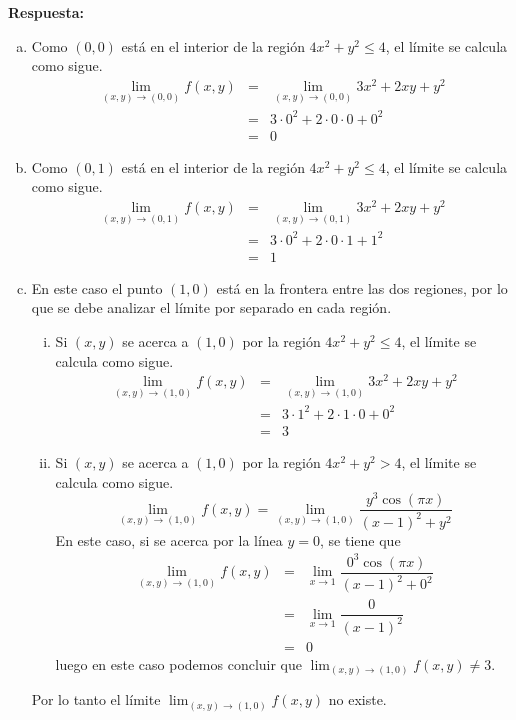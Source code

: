 \documentclass{article}
\begin{document}
\vspace{5mm}
\noindent\textbf{Respuesta:}
\begin{enumerate}[a)]
  \item Como $(0,0)$ está en el interior de la región $4x^2+y^2 \leq 4$, el límite se calcula como sigue.
    \begin{eqnarray*}
      \lim_{(x,y)\to(0,0)}f(x,y)  
        &=& \lim_{(x,y)\to(0,0)}3x^2+2xy+y^2\\
        &=& 3\cdot 0^2 + 2\cdot 0\cdot 0 + 0^2\\
        &=& 0
    \end{eqnarray*}
  \item Como $(0,1)$ está en el interior de la región $4x^2+y^2 \leq 4$, el límite se calcula como sigue.
    \begin{eqnarray*}
      \lim_{(x,y)\to(0,1)}f(x,y)  
        &=& \lim_{(x,y)\to(0,1)}3x^2+2xy+y^2\\
        &=& 3\cdot 0^2 + 2\cdot 0\cdot 1 + 1^2\\
        &=& 1
    \end{eqnarray*}
  \item En este caso el punto $(1,0)$ está en la frontera entre las dos regiones, por lo que se debe analizar el límite por separado en cada región.
    \begin{enumerate}[i.]
      \item Si $(x,y)$ se acerca a $(1,0)$ por la región $4x^2+y^2\leq 4$, el límite se calcula como sigue.
        \begin{eqnarray*}
          \lim_{(x,y)\to(1,0)}f(x,y)
            &=& \lim_{(x,y)\to(1,0)}3x^2+2xy+y^2\\
            &=& 3\cdot 1^2 + 2\cdot 1\cdot 0 + 0^2\\
            &=& 3
        \end{eqnarray*}
      \newpage
      \item Si $(x,y)$ se acerca a $(1,0)$ por la región $4x^2+y^2 > 4$, el límite se calcula como sigue.
        $$\lim_{(x,y)\to(1,0)}f(x,y) = \lim_{(x,y)\to(1,0)}\dfrac{y^3\cos(\pi x)}{(x-1)^2+y^2}$$
        En este caso, si se acerca por la línea $y=0$, se tiene que
        \begin{eqnarray*}
          \lim_{(x,y)\to(1,0)}f(x,y)
            &=& \lim_{x\to 1}\dfrac{0^3\cos(\pi x)}{(x-1)^2+0^2}\\
            &=& \lim_{x\to 1}\dfrac{0}{(x-1)^2}\\
            &=& 0
        \end{eqnarray*}
        luego en este caso podemos concluir que $\displaystyle\lim_{(x,y)\to(1,0)}f(x,y)\neq 3$.
    \end{enumerate}
    Por lo tanto el límite $\displaystyle\lim_{(x,y)\to(1,0)}f(x,y)$ no existe.
\end{enumerate}
\end{document}

